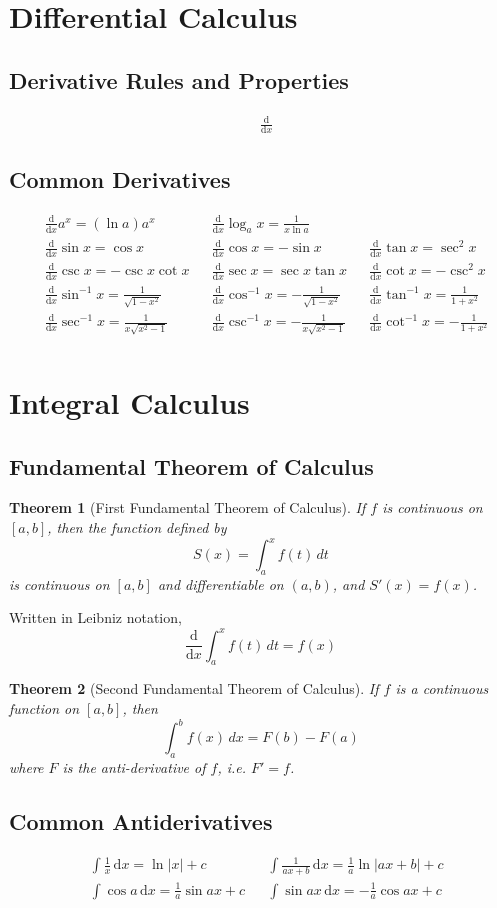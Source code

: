 \documentclass[12pt]{article}
\newcommand{\diff}[1]{\frac{\mathrm{d}}{\mathrm{d}#1}}
\newcommand{\der}[1]{\, \mathrm{d}#1}
\newtheorem{theorem}{Theorem}
\begin{document}
\section{Differential Calculus}

\subsection{Derivative Rules and Properties}
\begin{align*}
&\diff{x}
\end{align*}


\subsection{Common Derivatives}
\begin{align*}
&\diff{x}a^x = (\ln a)a^x & &\diff{x}\log_a x = \frac{1}{x\ln a} \\
&\diff{x}\sin x = \cos x & &\diff{x}\cos x = -\sin x & &\diff{x}\tan x = \sec^2 x\\
&\diff{x}\csc x = -\csc x \cot x & &\diff{x}\sec x = \sec x \tan x & &\diff{x}\cot x = -\csc^2 x \\
&\diff{x}\sin^{-1}x = \frac{1}{\sqrt{1 - x^2}} & &\diff{x}\cos^{-1}x = - \frac{1}{\sqrt{1 - x^2}} & &\diff{x}\tan^{-1}x = \frac{1}{1 + x^2} \\
&\diff{x}\sec^{-1}x = \frac{1}{ x \sqrt{x^2 - 1}} &  &\diff{x}\csc^{-1}x = -\frac{1}{ x \sqrt{x^2 - 1}} & &\diff{x}\cot^{-1}x = -\frac{1}{1 + x^2} \\
\end{align*}



\section{Integral Calculus}
\subsection{Fundamental Theorem of Calculus}
\begin{theorem}[First Fundamental Theorem of Calculus]
	\label{ftc}
	If $f$ is continuous on $[a,b]$, then the function defined by
	$$S(x)=\int _{ a }^{ x }{ f(t)\, dt }$$
	is continuous on $[a,b]$ and differentiable on $(a,b)$, and $S'(x)=f(x)$.
\end{theorem}
Written in Leibniz notation,
$$\diff{x}\int_{a}^{x} f(t)\, dt = f(x)$$

\begin{theorem}[Second Fundamental Theorem of Calculus]
	If $f$ is a continuous function on $[a,b]$, then	
	$$\int _{ a }^{ b }{ f(x)\, dx=F(b)-F(a)}$$
	where $F$ is the anti-derivative of $f$, i.e. $F'=f$.
\end{theorem}
\subsection{Common Antiderivatives}
\begin{align*}
&\int\frac{1}{x}\der{x} = \ln|x| + c & &\int{\frac{1}{ax + b}\der{x}} = \frac{1}{a}\ln|ax+b| + c \\
&\int \cos a \der{x}= \frac1a \sin ax + c & &\int \sin ax\der{x}= - \frac1a \cos ax + c \\
&
\end{align*}
\end{document}
